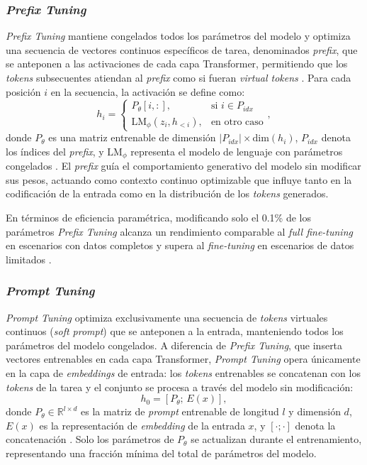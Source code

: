 \subsubsection{\textit{Prefix Tuning}}

\textit{Prefix Tuning} mantiene congelados todos los parámetros del modelo y optimiza una secuencia de vectores continuos específicos de tarea, denominados \textit{prefix}, que se anteponen a las activaciones de cada capa Transformer, permitiendo que los \textit{tokens} subsecuentes atiendan al \textit{prefix} como si fueran \textit{virtual tokens} \parencite[p.~4582]{li-liang-2021-prefix}. Para cada posición $i$ en la secuencia, la activación se define como:
\begin{equation}
h_i = \begin{cases}
P_\theta[i, :], & \text{si } i \in P_{idx} \\
\text{LM}_\phi(z_i, h_{<i}), & \text{en otro caso}
\end{cases},
\end{equation}
donde $P_\theta$ es una matriz entrenable de dimensión $|P_{idx}| \times \text{dim}(h_i)$, $P_{idx}$ denota los índices del \textit{prefix}, y $\text{LM}_\phi$ representa el modelo de lenguaje con parámetros congelados \parencite[p.~4585]{li-liang-2021-prefix}. El \textit{prefix} guía el comportamiento generativo del modelo sin modificar sus pesos, actuando como contexto continuo optimizable que influye tanto en la codificación de la entrada como en la distribución de los \textit{tokens} generados.

En términos de eficiencia paramétrica, modificando solo el 0.1\% de los parámetros \textit{Prefix Tuning} alcanza un rendimiento comparable al \textit{full fine-tuning} en escenarios con datos completos y supera al \textit{fine-tuning} en escenarios de datos limitados \parencite[p.~4582]{li-liang-2021-prefix}.

\subsubsection{\textit{Prompt Tuning}}

\textit{Prompt Tuning} \parencite[p.~3046]{lester-etal-2021-power} optimiza exclusivamente una secuencia de \textit{tokens} virtuales continuos (\textit{soft prompt}) que se anteponen a la entrada, manteniendo todos los parámetros del modelo congelados. A diferencia de \textit{Prefix Tuning}, que inserta vectores entrenables en cada capa Transformer, \textit{Prompt Tuning} opera únicamente en la capa de \textit{embeddings} de entrada: los \textit{tokens} entrenables se concatenan con los \textit{tokens} de la tarea y el conjunto se procesa a través del modelo sin modificación:
\begin{equation}
h_0 = [P_\theta;\, E(x)],
\end{equation}
donde $P_\theta \in \mathbb{R}^{l \times d}$ es la matriz de \textit{prompt} entrenable de longitud $l$ y dimensión $d$, $E(x)$ es la representación de \textit{embedding} de la entrada $x$, y $[\cdot;\cdot]$ denota la concatenación \parencite[p.~3047]{lester-etal-2021-power}. Solo los parámetros de $P_\theta$ se actualizan durante el entrenamiento, representando una fracción mínima del total de parámetros del modelo.

